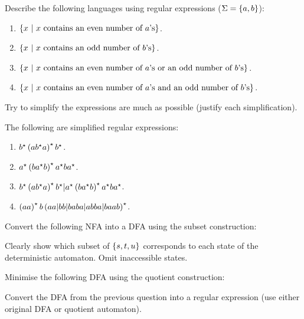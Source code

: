 \documentclass{article}
\begin{document}
\begin{question}
Describe the following languages using regular expressions ($\Sigma=\left\{ a,b \right\}$):
\begin{enumerate}
 \item $\left\{ x\ |\ \mbox{$x$ contains an even number of $a$'s} \right\}$.
 \item $\left\{ x\ |\ \mbox{$x$ contains an odd number of $b$'s} \right\}$.
 \item $\left\{ x\ |\ \mbox{$x$ contains an even number of $a$'s or an odd number of $b$’s} \right\}$.
 \item $\left\{ x\ |\ \mbox{$x$ contains an even number of $a$'s and an odd number of $b$’s} \right\}$.
\end{enumerate}
Try to simplify the expressions are much as possible (justify each simplification).
\begin{answer}
The following are simplified regular expressions:
\begin{enumerate}
 \item $b^{\star}\left( ab^{\star}a \right)^{\star}b^{\star}$.
 \item $a^{\star}\left( ba^{\star}b \right)^{\star}a^{\star}ba^{\star}$.
 \item $b^{\star}\left( ab^{\star}a \right)^{\star}b^{\star}|a^{\star}\left( ba^{\star}b \right)^{\star}a^{\star}ba^{\star}$.
 \item $\left( aa \right)^{\star}b\left( aa|bb|baba|abba|baab \right)^{\star}$.
\end{enumerate}
\end{answer}
\end{question}
\begin{question}
Convert the following NFA into a DFA using the subset construction:


Clearly show which subset of $\left\{ s,t,u \right\}$ corresponds to each state of the deterministic automaton. Omit inaccessible states.
\begin{answer}
\end{answer}
\end{question}
\begin{question}
Minimise the following DFA using the quotient construction:
\begin{answer}
\end{answer}
\end{question}
\begin{question}
Convert the DFA from the previous question into a regular expression (use either original DFA or quotient automaton).
\begin{answer}
\end{answer}
\end{question}
\end{document}
